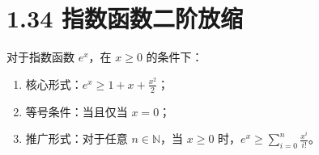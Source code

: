 \documentclass{article}
\begin{document}
\section*{1.34 指数函数二阶放缩}
对于指数函数 \( e^x \)，在 \( x \geq 0 \) 的条件下：
\begin{enumerate}
    \item 核心形式：\( e^x \geq 1 + x + \frac{x^2}{2} \)；
    \item 等号条件：当且仅当 \( x=0 \)；
    \item 推广形式：对于任意 \( n \in \mathbb{N} \)，当 \( x \geq 0 \) 时，\( e^x \geq \sum_{i=0}^n \frac{x^i}{i!} \)。
\end{enumerate}
\end{document}
